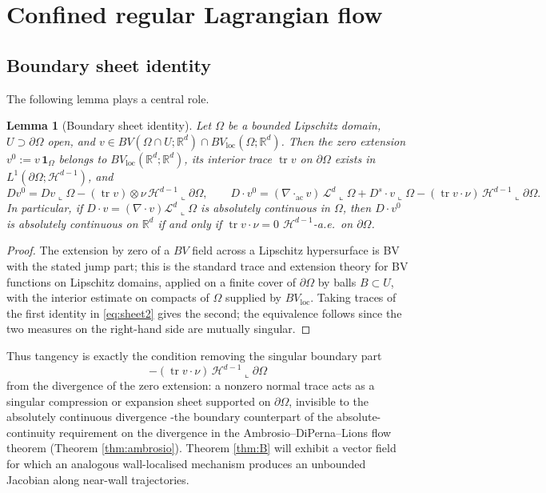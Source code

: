 \documentclass[11pt]{amsart}
\newtheorem{lemma}[theorem]{Lemma}
\theoremstyle{definition}
\newcommand{\Ld}{\mathcal{L}^d}
\newcommand{\Hd}{\mathcal{H}^{d-1}}
\newcommand{\tr}{\operatorname{tr}}
\newcommand{\dive}{\nabla\!\cdot}
\newcommand{\R}{\mathbb{R}}
\begin{document}
\section{Confined regular Lagrangian flow}
\label{sec:mainA}

\subsection{Boundary sheet identity}

The following  lemma plays a central role.
\begin{lemma}[Boundary sheet identity]\label{lem:sheet}
Let $\Omega$ be a bounded Lipschitz domain, $U\supset\partial\Omega$
open, and $v\in BV(\Omega\cap U;\R^d)\cap
BV_{\mathrm{loc}}(\Omega;\R^d)$. Then the zero extension
$v^0:=v\,\mathbf{1}_\Omega$ belongs to
$BV_{\mathrm{loc}}(\R^d;\R^d)$, its interior trace $\tr v$ on
$\partial\Omega$ exists in $L^1(\partial\Omega;\Hd)$, and
\begin{equation}\label{eq:sheet2}
Dv^0=Dv\llcorner\Omega-(\tr v)\otimes\nu\,\Hd\llcorner\partial\Omega,
\qquad
D\!\cdot v^0=(\dive_{\mathrm{ac}}v)\,\Ld\llcorner\Omega
+D^s\!\cdot v\llcorner\Omega
-(\tr v\cdot\nu)\,\Hd\llcorner\partial\Omega .
\end{equation}
In particular, if $D\!\cdot v=(\dive v)\Ld\llcorner\Omega$ is
absolutely continuous in $\Omega$, then $D\!\cdot v^0$ is absolutely
continuous on $\R^d$ \emph{if and only if} $\tr v\cdot\nu=0$
$\Hd$-a.e.\ on $\partial\Omega$.
\end{lemma}

\begin{proof}
The extension by zero of a $BV$ field across a Lipschitz hypersurface
is BV with the stated jump part; this is the standard trace and
extension theory for BV functions on Lipschitz domains, applied on a
finite cover of $\partial\Omega$ by balls $B\subset U$, with the
interior estimate on compacts of $\Omega$ supplied by
$BV_{\mathrm{loc}}$. Taking traces of the first identity in
\eqref{eq:sheet2} gives the second; the equivalence follows since the
two measures on the right-hand side are mutually singular.
\end{proof}
Thus tangency is exactly the condition removing the singular
boundary part $$-(\tr v\cdot\nu)\,\Hd\llcorner\partial\Omega$$ from the
divergence of the zero extension: a nonzero normal trace acts as a
singular compression or expansion sheet supported on
$\partial\Omega$, invisible to the absolutely continuous divergence
-the boundary counterpart of the absolute-continuity requirement on the divergence in the Ambrosio–DiPerna–Lions flow theorem (Theorem \ref{thm:ambrosio}). Theorem \ref{thm:B} will
exhibit a vector field for which an analogous wall-localised
mechanism produces an unbounded Jacobian along near-wall
trajectories.
\end{document}
